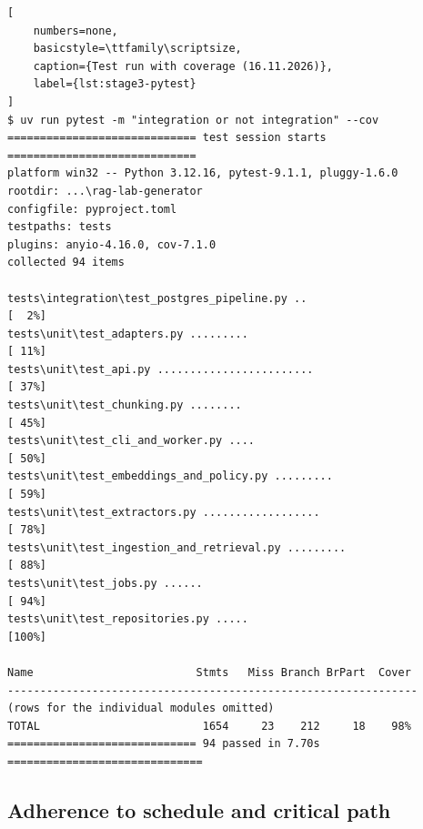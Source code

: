 \documentclass[12pt,a4paper]{article}
\begin{document}
\begin{lstlisting}[
    numbers=none,
    basicstyle=\ttfamily\scriptsize,
    caption={Test run with coverage (16.11.2026)},
    label={lst:stage3-pytest}
]
$ uv run pytest -m "integration or not integration" --cov
============================= test session starts =============================
platform win32 -- Python 3.12.16, pytest-9.1.1, pluggy-1.6.0
rootdir: ...\rag-lab-generator
configfile: pyproject.toml
testpaths: tests
plugins: anyio-4.16.0, cov-7.1.0
collected 94 items

tests\integration\test_postgres_pipeline.py ..                           [  2%]
tests\unit\test_adapters.py .........                                    [ 11%]
tests\unit\test_api.py ........................                          [ 37%]
tests\unit\test_chunking.py ........                                     [ 45%]
tests\unit\test_cli_and_worker.py ....                                   [ 50%]
tests\unit\test_embeddings_and_policy.py .........                       [ 59%]
tests\unit\test_extractors.py ..................                         [ 78%]
tests\unit\test_ingestion_and_retrieval.py .........                     [ 88%]
tests\unit\test_jobs.py ......                                           [ 94%]
tests\unit\test_repositories.py .....                                    [100%]

Name                         Stmts   Miss Branch BrPart  Cover
---------------------------------------------------------------
(rows for the individual modules omitted)
TOTAL                         1654     23    212     18    98%
============================= 94 passed in 7.70s ==============================
\end{lstlisting}

\subsection{Adherence to schedule and critical path}
\label{sec:stage3-schedule}
\end{document}
